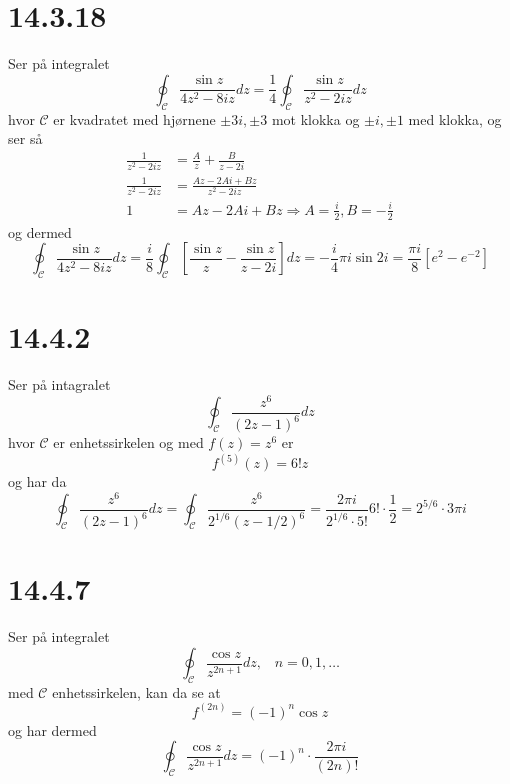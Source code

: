 \documentclass{report}
\newcommand{\bbrack}[1]{\left[ #1 \right]}
\begin{document}
\section*{14.3.18}
Ser på integralet
\begin{equation}
  \label{eq:7}
  \oint_{\mathcal{C}} \frac{\sin z}{4z^{2} - 8iz} dz = \frac{1}{4} \oint_{\mathcal{C}} \frac{\sin z}{z^{2} - 2iz} dz
\end{equation}
hvor $\mathcal{C}$ er kvadratet med hjørnene $\pm 3i, \pm 3$ mot klokka og $\pm i, \pm 1$ med klokka, og ser så
\begin{equation}
  \label{eq:8}
  \begin{split}
    \frac{1}{z^{2} - 2iz} &= \frac{A}{z} + \frac{B}{z - 2i} \\
    \frac{1}{z^{2} - 2iz} &= \frac{Az - 2Ai + Bz}{z^{2} - 2iz} \\
    1 &= Az - 2Ai + Bz \Rightarrow A = \frac{i}{2}, B = -\frac{i}{2}
  \end{split}
\end{equation}
og dermed
\begin{equation}
  \label{eq:9}
  \oint_{\mathcal{C}} \frac{\sin z}{4z^{2} - 8iz} dz = \frac{i}{8} \oint_{\mathcal{C}} \bbrack{ \frac{\sin z}{z} - \frac{\sin z}{z - 2i} }dz
  = -\frac{i}{4} \pi i \sin 2i = \frac{\pi i}{8} \bbrack{ e^{2} - e^{-2} }
\end{equation}


\section*{14.4.2}
Ser på intagralet
\begin{equation}
  \label{eq:10}
  \oint_{\mathcal{C}} \frac{z^{6}}{(2z-1)^{6}} dz
\end{equation}
hvor $\mathcal{C}$ er enhetssirkelen og med $f(z) = z^{6}$ er
\begin{equation}
  \label{eq:11}
  f^{(5)}(z) = 6! z
\end{equation}
og har da
\begin{equation}
  \label{eq:12}
  \oint_{\mathcal{C}} \frac{z^{6}}{(2z-1)^{6}} dz = \oint_{\mathcal{C}} \frac{z^{6}}{2^{1/6}(z-1/2)^{6}} = \frac{2\pi i}{2^{1/6}\cdot 5!} 6! \cdot \frac{1}{2} = 2^{5/6} \cdot 3\pi i
\end{equation}


\section*{14.4.7}
Ser på integralet
\begin{equation}
  \label{eq:13}
  \oint_{\mathcal{C}} \frac{\cos z}{z^{2n+1}} dz, \;\;\; n = 0, 1, \dots
\end{equation}
med $\mathcal{C}$ enhetssirkelen, kan da se at
\begin{equation}
  \label{eq:14}
  f^{(2n)} = (-1)^{n} \cos z
\end{equation}
og har dermed
\begin{equation}
  \label{eq:15}
  \oint_{\mathcal{C}} \frac{\cos z}{z^{2n+1}} dz = (-1)^{n} \cdot \frac{2\pi i}{(2n)!}
\end{equation}
\end{document}
